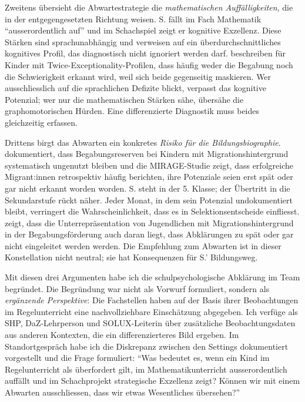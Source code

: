 \documentclass[ngerman, a4paper]{article}
\begin{document}
Zweitens übersieht die Abwartestrategie die \textit{mathematischen
Auffälligkeiten}, die in der entgegengesetzten Richtung weisen. S. fällt
im Fach Mathematik \enquote{ausserordentlich auf} und im Schachspiel zeigt
er kognitive Exzellenz. Diese Stärken sind sprachunabhängig und verweisen
auf ein überdurchschnittliches kognitives Profil, das diagnostisch nicht
ignoriert werden darf. \textcite[Kap.\,2.2]{preckel2013hochbegabung} beschreiben für Kinder mit
Twice-Exceptionality-Profilen, dass häufig weder die Begabung noch die
Schwierigkeit erkannt wird, weil sich beide gegenseitig maskieren. Wer
ausschliesslich auf die sprachlichen Defizite blickt, verpasst das
kognitive Potenzial; wer nur die mathematischen Stärken sähe, übersähe
die graphomotorischen Hürden. Eine differenzierte Diagnostik muss beides
gleichzeitig erfassen.

Drittens birgt das Abwarten ein konkretes \textit{Risiko für die
Bildungsbiographie}. \textcite{stamm2014mirage} dokumentiert, dass Begabungsreserven bei Kindern
mit Migrationshintergrund systematisch ungenutzt bleiben und die
MIRAGE-Studie zeigt, dass erfolgreiche Migrant:innen retrospektiv häufig
berichten, ihre Potenziale seien erst spät oder gar nicht erkannt worden
worden. S. steht in der 5. Klasse; der Übertritt in
die Sekundarstufe rückt näher. Jeder Monat, in dem sein Potenzial
undokumentiert bleibt, verringert die Wahrscheinlichkeit, dass es in
Selektionsentscheide einfliesst. \textcite[S.\,105--184]{leikhof2021jugendliche} zeigt, dass die Unterrepräsentation
von Jugendlichen mit Migrationshintergrund in der Begabungsförderung auch
daran liegt, dass Abklärungen zu spät oder gar nicht eingeleitet werden
werden. Die Empfehlung zum Abwarten ist in
dieser Konstellation nicht neutral; sie hat Konsequenzen für S.' Bildungsweg.

Mit diesen drei Argumenten habe ich die schulpsychologische Abklärung im
Team begründet. Die Begründung war nicht als Vorwurf formuliert, sondern
als \textit{ergänzende Perspektive}: Die Fachstellen haben auf der Basis
ihrer Beobachtungen im Regelunterricht eine nachvollziehbare Einschätzung
abgegeben. Ich verfüge als SHP, DaZ-Lehrperson und SOLUX-Leiterin über
zusätzliche Beobachtungsdaten aus anderen Kontexten, die ein differenzierteres
Bild ergeben. Im Standortgespräch habe ich die Diskrepanz zwischen den
Settings dokumentiert vorgestellt und die Frage formuliert:
\enquote{Was bedeutet es, wenn ein Kind im Regelunterricht als überfordert
gilt, im Mathematikunterricht ausserordentlich auffällt und im Schachprojekt
strategische Exzellenz zeigt? Können wir mit einem Abwarten ausschliessen,
dass wir etwas Wesentliches übersehen?}
\end{document}
